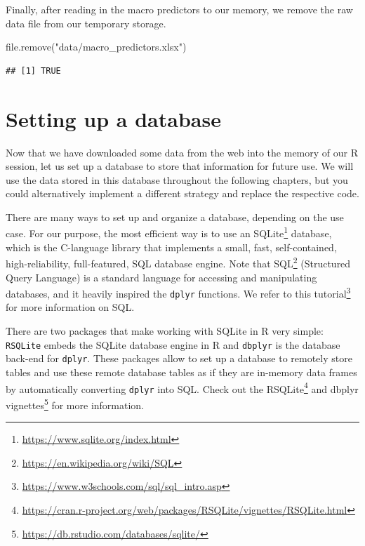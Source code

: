 \documentclass[
]{book}
\newenvironment{Shaded}{\begin{snugshade}}{\end{snugshade}}
\newcommand{\FunctionTok}[1]{\textcolor[rgb]{0,0,0}{#1}}
\newcommand{\NormalTok}[1]{#1}
\newcommand{\StringTok}[1]{\textcolor[rgb]{0.5,0.5,0.5}{#1}}
\renewcommand{\href}[2]{#2\footnote{\url{#1}}}
\begin{document}
Finally, after reading in the macro predictors to our memory, we remove the raw data file from our temporary storage.

\begin{Shaded}
\begin{Highlighting}[]
\FunctionTok{file.remove}\NormalTok{(}\StringTok{"data/macro\_predictors.xlsx"}\NormalTok{)}
\end{Highlighting}
\end{Shaded}

\begin{verbatim}
## [1] TRUE
\end{verbatim}

\hypertarget{setting-up-a-database}{%
\section{Setting up a database}\label{setting-up-a-database}}

Now that we have downloaded some data from the web into the memory of our R session, let us set up a database to store that information for future use. We will use the data stored in this database throughout the following chapters, but you could alternatively implement a different strategy and replace the respective code.

There are many ways to set up and organize a database, depending on the use case. For our purpose, the most efficient way is to use an \href{https://www.sqlite.org/index.html}{SQLite} database, which is the C-language library that implements a small, fast, self-contained, high-reliability, full-featured, SQL database engine. Note that \href{https://en.wikipedia.org/wiki/SQL}{SQL} (Structured Query Language) is a standard language for accessing and manipulating databases, and it heavily inspired the \texttt{dplyr} functions. We refer to \href{https://www.w3schools.com/sql/sql_intro.asp}{this tutorial} for more information on SQL.

There are two packages that make working with SQLite in R very simple: \texttt{RSQLite} embeds the SQLite database engine in R and \texttt{dbplyr} is the database back-end for \texttt{dplyr}. These packages allow to set up a database to remotely store tables and use these remote database tables as if they are in-memory data frames by automatically converting \texttt{dplyr} into SQL. Check out the \href{https://cran.r-project.org/web/packages/RSQLite/vignettes/RSQLite.html}{RSQLite} and \href{https://db.rstudio.com/databases/sqlite/}{dbplyr vignettes} for more information.
\end{document}
